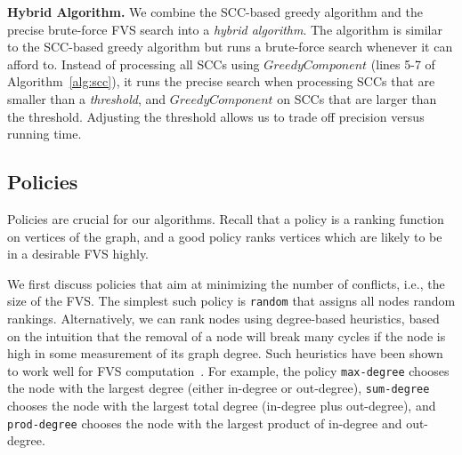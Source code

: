 {\bf Hybrid Algorithm.}
We combine the SCC-based greedy algorithm and the precise brute-force FVS search into a \emph{hybrid algorithm}. The algorithm is similar to the SCC-based greedy algorithm but runs a brute-force search whenever it can afford to. Instead of processing all SCCs using $GreedyComponent$ (lines 5-7 of Algorithm~\ref{alg:scc}), it runs the precise search when processing SCCs that are smaller than a \emph{threshold}, and $GreedyComponent$ on SCCs that are larger than the threshold. Adjusting the threshold allows us to trade off precision versus running time.

\subsection{Policies}
\label{subsec:validator_reordering:policy}
Policies are crucial for our algorithms. Recall that a policy is a ranking function on vertices of the graph, and a good policy ranks vertices which are likely to be in a desirable FVS highly. 

We first discuss policies that aim at minimizing the number of conflicts, i.e., the size of the FVS. The simplest such policy is \texttt{random} that assigns all nodes random rankings. Alternatively, we can rank nodes using degree-based heuristics, based on the intuition that the removal of a node will break many cycles if the node is high in some measurement of its graph degree. Such heuristics have  been shown to work well for FVS computation~\cite{cutello2015targeting}. For example, the policy \texttt{max-degree} chooses the node with the largest degree (either in-degree or out-degree), \texttt{sum-degree} chooses the node with the largest total degree (in-degree plus out-degree), and \texttt{prod-degree} chooses the node with the largest product of in-degree and out-degree. 

